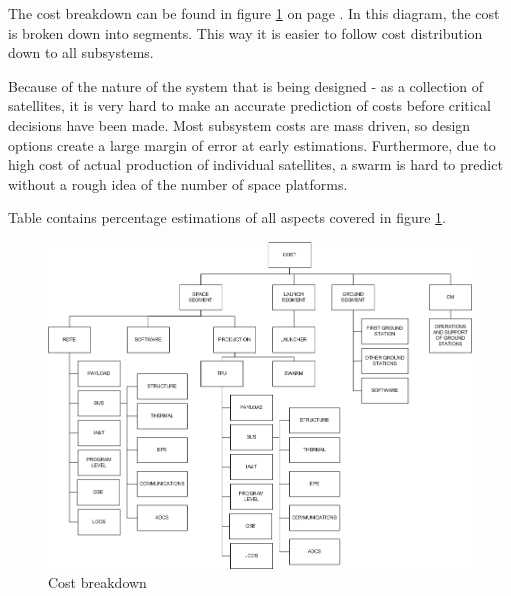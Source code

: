 The cost breakdown can be found in figure \ref{fig:costbreak} on page \pageref{fig:costbreak}. In this diagram, the cost is broken down into segments. This way it is easier to follow cost distribution down to all subsystems.

Because of the nature of the system that is being designed - as a collection of satellites, it is very hard to make an accurate prediction of costs before critical decisions have been made. Most subsystem costs are mass driven, so design options create a large margin of error at early estimations. Furthermore, due to high cost of actual production of individual satellites, a swarm is hard to predict without a rough idea of the number of space platforms.

Table  contains percentage estimations of all aspects covered in figure \ref{fig:costbreak}.





\begin{figure}[H]
\begin{center}

\includegraphics[width=1.0\textwidth,angle=90]{chapters/img/costbreakdown.jpg}
\caption{Cost breakdown}
\label{fig:costbreak}
\end{center}
\end{figure}
